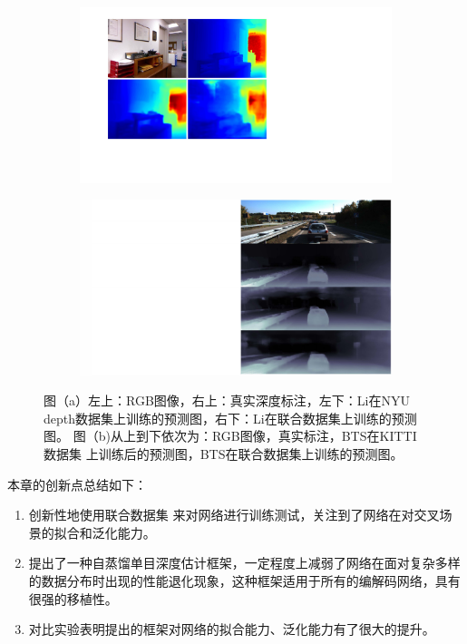 \begin{figure}[htb]
    \centering
    \begin{subfigure}{0.55\textwidth}
    \includegraphics[width=0.95\linewidth]{figure/nyu_class_fail.pdf}
    \caption{}
    \end{subfigure}
    \begin{subfigure}{0.36\textwidth}
    \includegraphics[width = 0.95\linewidth]{figure/kitti_bts_fail.pdf}
    \caption{}
    \end{subfigure}
    \caption{图（a）左上：RGB图像，右上：真实深度标注，左下：Li\cite{DABC}在NYU
    depth数据集上训练的预测图，右下：Li\cite{DABC}在联合数据集上训练的预测图。
    图（b)从上到下依次为：RGB图像，真实标注，BTS\cite{bts}在KITTI数据集
    上训练后的预测图，BTS\cite{bts}在联合数据集上训练的预测图。}
  \label{train_once_problem}
 \end{figure}
本章的创新点总结如下：
\begin{enumerate}
    \item 创新性地使用联合数据集
    来对网络进行训练测试，关注到了网络在对交叉场景的拟合和泛化能力。
    \item 提出了一种自蒸馏单目深度估计框架，一定程度上减弱了网络在面对复杂多样
    的数据分布时出现的性能退化现象，这种框架适用于所有的编解码网络，具有很强的移植性。
    \item 对比实验表明提出的框架对网络的拟合能力、泛化能力有了很大的提升。
\end{enumerate}

